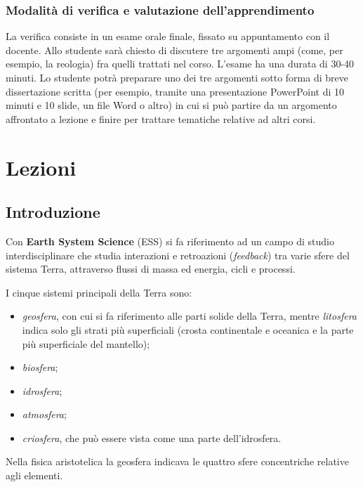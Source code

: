 \documentclass[a4paper,12pt]{book}
\begin{document}
\subsection{Modalità di verifica e valutazione dell'apprendimento}

La verifica consiste in un esame orale finale, fissato su appuntamento con il docente. 
Allo studente sarà chiesto di discutere tre argomenti ampi (come, per esempio, la reologia) fra quelli trattati nel corso. 
L'esame ha una durata di 30-40 minuti.
Lo studente potrà preparare uno dei tre argomenti sotto forma di breve dissertazione scritta (per esempio, tramite una presentazione PowerPoint di 10 minuti e 10 slide, un file Word o altro) in cui si può partire da un argomento affrontato a lezione e finire per trattare tematiche relative ad altri corsi.

\chapter{Lezioni}

\section{\textcolor{colore2}{Introduzione}}

Con \textbf{Earth System Science} (ESS) si fa riferimento ad un campo di studio interdisciplinare che studia interazioni e retroazioni (\textit{feedback}) tra varie sfere del sistema Terra, attraverso flussi di massa ed energia, cicli e processi.

\noindent I cinque sistemi principali della Terra sono:

\begin{itemize}
    \item \textit{geosfera}, con cui si fa riferimento alle parti solide della Terra, mentre \textit{litosfera} indica solo gli strati più superficiali (crosta continentale e oceanica e la parte più superficiale del mantello);
    \item \textit{biosfera};
    \item \textit{idrosfera};
    \item \textit{atmosfera};
    \item \textit{criosfera}, che può essere vista come una parte dell'idrosfera.
\end{itemize} 

\noindent
Nella fisica aristotelica la geosfera indicava le quattro sfere concentriche relative agli elementi.
\end{document}
